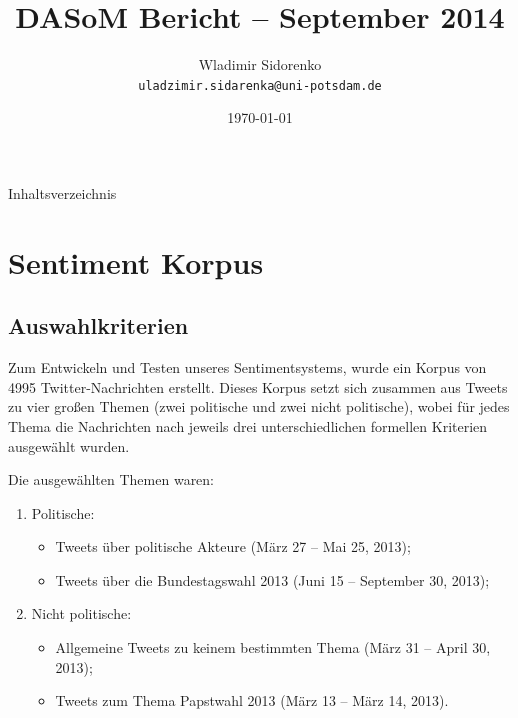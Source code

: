 \documentclass{beamer}
\title[Bericht 2014]{DASoM Bericht -- September 2014}
\author[Sidorenko]{Wladimir Sidorenko\\ \texttt{uladzimir.sidarenka{@}uni-potsdam.de}}
\institute[Uni Potsdam]{University of Potsdam}
\date{\today}
\begin{document}
    \begin{frame}{}
      \titlepage
    \end{frame}

    \begin{frame}{Inhaltsverzeichnis}
      \tableofcontents
    \end{frame}

    \section{Sentiment Korpus}
    \subsection{Auswahlkriterien}
    \begin{frame}{\insertsubsection}
      Zum Entwickeln und Testen unseres Sentimentsystems, wurde ein Korpus von
      4995 Twitter-Nachrichten erstellt.  Dieses Korpus setzt sich zusammen
      aus Tweets zu vier gro\ss{}en Themen (zwei politische und zwei nicht
      politische), wobei f\"ur jedes Thema die Nachrichten nach jeweils drei
      unterschiedlichen formellen Kriterien ausgew\"ahlt wurden.
    \end{frame}

    \begin{frame}{\insertsubsection}
      Die ausgew\"ahlten Themen waren:
      \begin{enumerate}
      \item Politische:
        \begin{itemize}
        \item Tweets \"uber politische Akteure {\tiny(M\"arz 27 -- Mai 25,
          2013)};
        \item Tweets \"uber die Bundestagswahl 2013 {\tiny(Juni 15 --
          September 30, 2013)};
        \end{itemize}

      \item Nicht politische:
        \begin{itemize}
        \item Allgemeine Tweets zu keinem bestimmten Thema {\tiny(M\"arz
          31 -- April 30, 2013)};
        \item Tweets zum Thema Papstwahl 2013 {\tiny(M\"arz 13 -- M\"arz 14,
          2013)}.
        \end{itemize}
      \end{enumerate}
    \end{frame}
\end{document}
